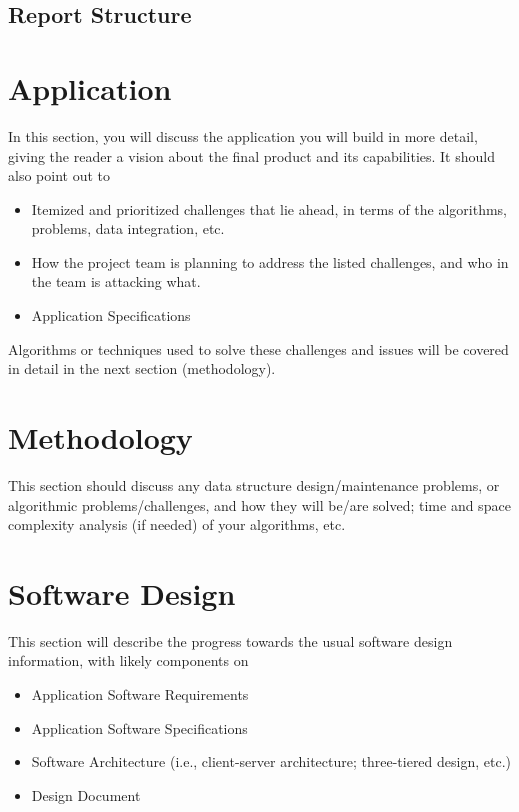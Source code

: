 \documentclass[letterpaper,12pt]{article}
\begin{document}
\subsection{Report Structure}

\newpage



\section{Application}
In this section, you will discuss the application you will build in more detail,
giving the reader a vision about the final product and its capabilities. It
should also point out to

\begin{itemize}
  \item Itemized and prioritized challenges that lie ahead, in terms of the
  algorithms, problems, data integration, etc.
  \item How the project team is planning to address the listed challenges, and
  who in the team is attacking what.
  \item Application Specifications 
\end{itemize}

Algorithms or techniques used to solve these challenges and issues will be
covered in detail in the next section (methodology).

\newpage



\section{Methodology}
This section should discuss any data structure design/maintenance problems, or
algorithmic problems/challenges, and how they will be/are solved; time and space
complexity analysis (if needed) of your algorithms, etc.

\newpage



\section{Software Design}
This section will describe the progress towards the usual software design
information, with likely components on

\begin{itemize}
  \item Application Software Requirements
  \item Application Software Specifications
  \item Software Architecture (i.e., client-server architecture; three-tiered
  design, etc.)
  \item Design Document
\end{itemize}
\end{document}
